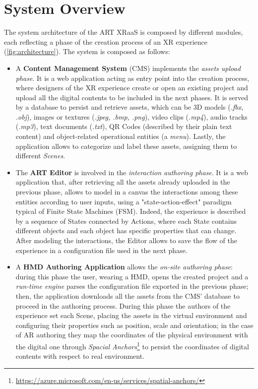 \section{System Overview}
\label{sec:art-overview}

The system architecture of the ART XRaaS is composed by different modules, each reflecting a phase of the creation process of an \gls{XR} experience (\autoref{fig:architecture}). The system is composed as follows:
\begin{itemize}
    \item A \textbf{Content Management System} (CMS) implements the \emph{assets upload phase}. It is a web application acting as entry point into the creation process, where designers of the \gls{XR} experience create or open an existing project and upload all the digital contents to be included in the next phases. It is served by a database to persist and retrieve assets, which can be 3D models (\textit{.fbx, .obj}), images or textures (\textit{.jpeg, .bmp, .png}), video clips (\textit{.mp4}), audio tracks (\textit{.mp3}), text documents (\textit{.txt}), QR Codes (described by their plain text content) and object-related operational entities (a \textit{menu}). Lastly, the application allows to categorize and label these assets, assigning them to different \emph{Scenes}.

    \item The \textbf{ART Editor} is involved in the \emph{interaction authoring phase}. It is a web application that, after retrieving all the assets already uploaded in the previous phase, allows to model in a canvas the interactions among these entities according to user inputs, using a "state-action-effect" paradigm typical of Finite State Machines (FSM). Indeed, the experience is described by a sequence of States connected by Actions, where each State contains different objects and each object has specific properties that can change. After modeling the interactions, the Editor allows to save the flow of the experience in a configuration file used in the next phase.
    
    \item A \textbf{\gls{HMD} Authoring Application} allows the \emph{on-site authoring phase}: during this phase the user, wearing a \gls{HMD}, opens the created project and a \emph{run-time engine} parses the configuration file exported in the previous phase; then, the application downloads all the assets from the CMS' database to proceed in the authoring process. During this phase the authors of the experience set each Scene, placing the assets in the virtual environment and configuring their properties such as position, scale and orientation; in the case of \gls{AR} authoring they map the coordinates of the physical environment with the digital one through \emph{Spacial Anchors}\footnote{\url{https://azure.microsoft.com/en-us/services/spatial-anchors/}} to persist the coordinates of digital contents with respect to real environment. 
    

\end{itemize}
